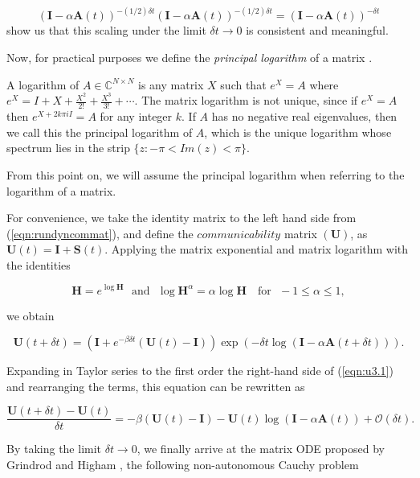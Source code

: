$$(\mathbf{I} - \alpha\mathbf{A}(t))^{-(1/2)\delta t} (\mathbf{I} - \alpha\mathbf{A}(t))^{-(1/2)\delta t} = (\mathbf{I} - \alpha\mathbf{A}(t))^{-\delta t}$$ show us that this scaling under the limit $\delta t \to 0$ is consistent and meaningful.

Now, for practical purposes we define the \textit{principal logarithm} of a matrix \cite[Ch.\ 11]{higham2008functions}.
\begin{definition}
    A logarithm of $A \in \mathbb{C}^{N\times N}$ is any matrix $X$ such that $e^X = A$ where $e^X = I + X + \frac{X^2}{2!} + \frac{X^3}{3!} + \cdots$. The matrix logarithm is not unique, since if $e^X = A$ then $e^{X+2k\pi iI} = A$ for any integer $k$. If $A$ has no negative real eigenvalues, then we call this the principal logarithm of $A$, which is the unique logarithm whose spectrum lies in the strip $\{ z : −\pi < Im(z) < \pi \}$.
\end{definition}
From this point on, we will assume the principal logarithm when referring to the logarithm of a matrix. 

For convenience, we take the identity matrix to the left hand side from (\ref{eqn:rundyncommat}), and define the $\textit{communicability}$ matrix $(\mathbf{U})$, as  $\mathbf{U}(t)=\mathbf{I} + \mathbf{S}(t)$. Applying the matrix exponential and matrix logarithm with the identities \cite[Ch.\ 11]{higham2008functions}

$$\mathbf{H} =e^{\log \mathbf{H}} \text{~~and~~} \log \mathbf{H}^\alpha =\alpha\log \mathbf{H} \text{~~~for~~} -1 \le \alpha \le 1,$$ 

we obtain 

\begin{equation}
\label{eqn:u3.1}
    \mathbf{U}(t + \delta t) = \left(\mathbf{I} + e^{-\beta\delta t}(\mathbf{U}(t) - \mathbf{I})\right) \exp\left(-\delta t \log (\mathbf{I} - \alpha \mathbf{A}(t + \delta t)) \right).
\end{equation} 

Expanding in Taylor series to the first order the right-hand
side of (\ref{eqn:u3.1}) and rearranging the terms, this equation can be rewritten as

\begin{equation*}
\label{eqn:u3.1b}
    \frac{\mathbf{U}(t + \delta t) - \mathbf{U}(t)}{\delta t} = -\beta (\mathbf{U}(t) - \mathbf{I}) - \mathbf{U}(t)\log (\mathbf{I} - \alpha \mathbf{A}(t)) + \mathcal{O}(\delta t).
\end{equation*}

By taking the limit $\delta t \to 0$, we finally arrive at the matrix ODE proposed by Grindrod and Higham \cite{grindrod2014dynamical}, the following non-autonomous Cauchy problem

